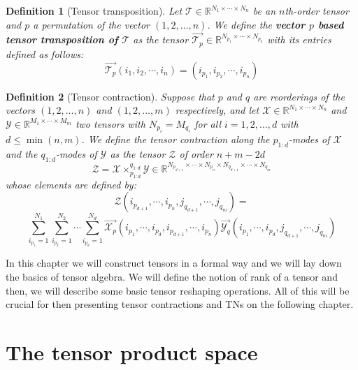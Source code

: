 \documentclass[11pt,a4paper,openright,oneside]{book}
\numberwithin{equation}{section}
\newtheorem{defn0}{Definition}[chapter]
\newenvironment{definition}{ \begin{defn0}}{\end{defn0}}
\begin{document}
\begin{definition}[Tensor transposition]
     Let $\mathcal{T} \in \mathbb{R}^{N_1 \times \cdots \times N_n}$
    be an $n$th-order tensor and $p$ a permutation of the vector $(1, 2, \dots, n)$. We define the \textbf{vector $p$ based tensor
    transposition of $\mathcal{T}$} as the tensor $\overrightarrow{\mathcal{T}_p} \in \mathbb{R}^{N_{p_1} \times \cdots \times N_{p_n}}$ with its entries defined as follows:
    $$\overrightarrow{\mathcal{T}_p}(i_1, i_2, \cdots, i_n) = (i_{p_1}, i_{p_2}, \cdots, i_{p_n})$$
\end{definition}

\begin{definition}[Tensor contraction]
     Suppose that $p$ and $q$ are reorderings of the vectors
    $(1,2,\dots,n)$ and $(1,2,\dots,m)$ respectively, and let ${\mathcal{X} \in \mathbb{R}^{N_1 \times \cdots \times N_n}}$ 
    and $\mathcal{Y} \in \mathbb{R}^{M_1 \times \cdots \times M_m}$ two tensors with $N_{p_i} = M_{q_i}$ for all $i = 1,2,\dots,d$
    with $d \leqslant \min{(n, m)}$. We define the tensor contraction along the $p_{1:d}$-modes of $\mathcal{X}$ and the $q_{1:d}$-modes
    of $\mathcal{Y}$ as the tensor $\mathcal{Z}$ of order $n + m - 2d$
$$\mathcal{Z} = \mathcal{X} \times_{p_{1:d}}^{q_{1:d}} \mathcal{Y} \in \mathbb{R}^{N_{p_{d+1}} \times \cdots \times N_{p_{n}} \times N_{q_{d+1}} \times \cdots \times N_{q_m}}$$
whose elements are defined by:
$$\mathcal{Z}(i_{p_{d+1}}, \cdots, i_{p_n}, j_{q_{d+1}}, \cdots, j_{q_m}) = $$$$ \sum_{i_{p_1} = 1}^{N_1} \sum_{i_{p_2} = 1}^{N_2} \cdots \sum_{i_{p_d} = 1}^{N_d}
\overrightarrow{\mathcal{X}_p}(i_{p_1}, \cdots, i_{p_d}, i_{p_{d+1}}, \cdots, i_{p_n}) \overrightarrow{\mathcal{Y}_q}(i_{p_1}, \cdots, i_{p_d}, j_{q_{d+1}}, \cdots, j_{q_m})$$
\end{definition}



\fi


In this chapter we will construct tensors in a formal way and we will lay down the basics of tensor algebra. We will
define the notion of rank of a tensor and then,
we will describe some basic tensor reshaping operations.
All of this will be crucial for then presenting tensor contractions and \gls{TN}s on the following chapter.

\section{The tensor product space}
\end{document}

